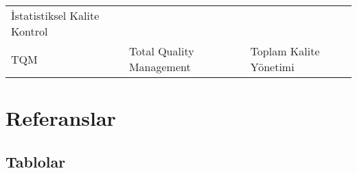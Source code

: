 \documentclass[
]{book}
\begin{document}
\begin{longtable}[]{@{}lll@{}}
\begin{minipage}[t]{0.31\columnwidth}
İstatistiksel Kalite Kontrol\strut
\end{minipage}\tabularnewline
\begin{minipage}[t]{0.31\columnwidth}\raggedright
TQM\strut
\end{minipage} & \begin{minipage}[t]{0.29\columnwidth}\raggedright
Total Quality Management\strut
\end{minipage} & \begin{minipage}[t]{0.31\columnwidth}\raggedright
Toplam Kalite Yönetimi\strut
\end{minipage}\tabularnewline
\bottomrule
\end{longtable}

\hypertarget{referanslar}{%
\chapter*{Referanslar}\label{referanslar}}

\hypertarget{tablolar}{%
\section{Tablolar}\label{tablolar}}

  
\end{document}
